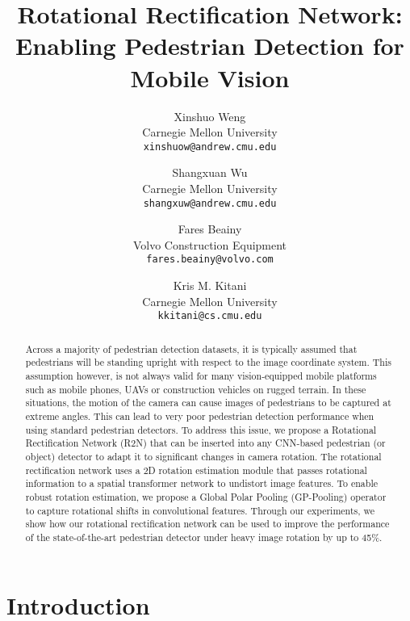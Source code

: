 \documentclass[10pt,twocolumn,letterpaper]{article}
\begin{document}
\title{Rotational Rectification Network: \\Enabling Pedestrian Detection for Mobile Vision}


\author{Xinshuo Weng\\
Carnegie Mellon University\\
{\tt\small xinshuow@andrew.cmu.edu}
\and
Shangxuan Wu\\
Carnegie Mellon University\\
{\tt\small shangxuw@andrew.cmu.edu}
\and
Fares Beainy\\
Volvo Construction Equipment \\
{\tt\small fares.beainy@volvo.com}
\and
Kris M. Kitani\\
Carnegie Mellon University\\
{\tt\small kkitani@cs.cmu.edu}
}


\maketitle
\ifwacvfinal\thispagestyle{empty}\fi


\begin{abstract}
Across a majority of pedestrian detection datasets, it is typically assumed that pedestrians will be standing upright with respect to the image coordinate system. This assumption however, is not always valid for many vision-equipped mobile platforms such as mobile phones, UAVs or construction vehicles on rugged terrain. In these situations, the motion of the camera can cause images of pedestrians to be captured at extreme angles. This can lead to very poor pedestrian detection performance when using standard pedestrian detectors. To address this issue, we propose a Rotational Rectification Network (R2N) that can be inserted into any CNN-based pedestrian (or object) detector to adapt it to significant changes in camera rotation. The rotational rectification network uses a 2D rotation estimation module that passes rotational information to a spatial transformer network \cite{Jaderberg2015} to undistort image features. To enable robust rotation estimation, we propose a Global Polar Pooling (GP-Pooling) operator to capture rotational shifts in convolutional features. Through our experiments, we show how our rotational rectification network can be used to improve the performance of the state-of-the-art pedestrian detector under heavy image rotation by up to 45\%.
\end{abstract}


\section{Introduction} \label{sec:intro}
\end{document}
